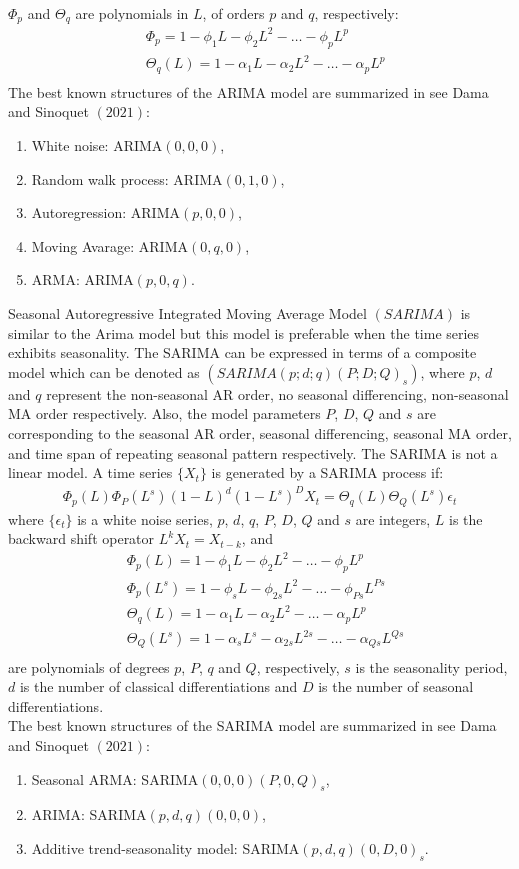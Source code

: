  $\Phi_{p}$ and $\Theta_{q}$ are polynomials in $L$, of orders $p$ and $q$, 
 respectively:
 \begin{align*}
 &\Phi_{p}=1-\phi_{1}L-\phi_{2}L^{2}-\ldots-\phi_{p}L^{p}\\
  &\Theta_{q}(L)=1-\alpha_{1}L-\alpha_{2}L^{2}-\ldots-\alpha_{p}L^{p}\\
\end{align*}
The best known structures of the ARIMA model are summarized in
 see Dama and Sinoquet $(2021)$:
\begin{enumerate}
\item White noise: ARIMA$(0,0,0)$,
\item Random walk process: ARIMA$(0,1,0)$,
\item Autoregression: ARIMA$(p,0,0)$,
\item Moving Avarage: ARIMA$(0,q,0)$,
\item ARMA: ARIMA$(p,0,q)$.
\end{enumerate}
Seasonal Autoregressive Integrated Moving Average Model $(SARIMA)$
 is similar to the Arima model but this model is preferable
when the time series exhibits seasonality. The SARIMA can be
expressed in terms of a composite model which can be denoted as
$(SARIMA(p; d; q)(P;D;Q)_{s})$, where  $p$, $d$ and
$q$ represent the non-seasonal AR order, no seasonal differencing,
non-seasonal MA order respectively. Also, the model parameters
$P$, $D$, $Q$ and $s$ are corresponding to the seasonal AR order,
seasonal differencing, seasonal MA order, and time span of
repeating seasonal pattern respectively. The SARIMA is not a
 linear model. A time series $\{X_{t}\}$ is generated by 
 a SARIMA process if:
 \begin{align*}
 \Phi_{p}(L)\Phi_{P}\left(L^{s}\right) (1-L)^{d}\left(1-L^{s}\right)^{D}X_{t}=\Theta_{q}(L)
 \Theta_{Q}(L^{s})\epsilon_{t}
 \end{align*}
 where $\{\epsilon_{t}\}$ is a white noise series, $p$, $d$, $q$,
  $P$, $D$, $Q$ and $s$ are integers, $L$ is the backward shift operator
 $L^{k}X_{t}= X_{t-k}$, and
  \begin{align*}
  &\Phi_{p}(L)=1-\phi_{1}L-\phi_{2}L^{2}-\ldots-\phi_{p}L^{p}\\
  &\Phi_{p}(L^{s})=1-\phi_{s}L-\phi_{2s}L^{2}-\ldots-\phi_{Ps}L^{Ps}\\
  &\Theta_{q}(L)=1-\alpha_{1}L-\alpha_{2}L^{2}-\ldots-\alpha_{p}L^{p}\\
  &\Theta_{Q}(L^{s})=1-\alpha_{s}L^{s}-\alpha_{2s}L^{2s}-\ldots-\alpha_{Qs}L^{Qs}\\
 \end{align*}
 are polynomials of degrees $p$, $P$, $q$ and $Q$, respectively, $s$ is the seasonality period, $d$ is the number of
 classical differentiations and $D$ is the number of seasonal differentiations.\\
 The best known structures of the SARIMA model are summarized in see Dama and Sinoquet $(2021)$:
 \begin{enumerate}
 	\item Seasonal ARMA: SARIMA$(0,0,0)(P,0,Q)_{s}$,
 	\item ARIMA: SARIMA$(p,d,q)(0,0,0)$,
 	\item  Additive trend-seasonality model: SARIMA$(p,d,q)(0,D,0)_{s}$.
 \end{enumerate}